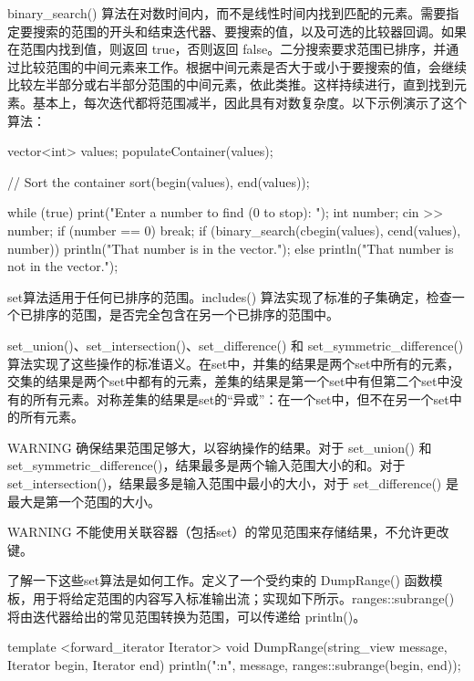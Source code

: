 binary\_search() 算法在对数时间内，而不是线性时间内找到匹配的元素。需要指定要搜索的范围的开头和结束迭代器、要搜索的值，以及可选的比较器回调。如果在范围内找到值，则返回 true，否则返回 false。二分搜索要求范围已排序，并通过比较范围的中间元素来工作。根据中间元素是否大于或小于要搜索的值，会继续比较左半部分或右半部分范围的中间元素，依此类推。这样持续进行，直到找到元素。基本上，每次迭代都将范围减半，因此具有对数复杂度。以下示例演示了这个算法：

\begin{cpp}
vector<int> values;
populateContainer(values);

// Sort the container
sort(begin(values), end(values));

while (true) {
    print("Enter a number to find (0 to stop): ");
    int number;
    cin >> number;
    if (number == 0) { break; }
    if (binary_search(cbegin(values), cend(values), number)) {
        println("That number is in the vector.");
    } else {
        println("That number is not in the vector.");
    }
}
\end{cpp}


set算法适用于任何已排序的范围。includes() 算法实现了标准的子集确定，检查一个已排序的范围，是否完全包含在另一个已排序的范围中。

set\_union()、set\_intersection()、set\_difference() 和 set\_symmetric\_difference() 算法实现了这些操作的标准语义。在set中，并集的结果是两个set中所有的元素，交集的结果是两个set中都有的元素，差集的结果是第一个set中有但第二个set中没有的所有元素。对称差集的结果是set的“异或”：在一个set中，但不在另一个set中的所有元素。

\begin{myWarning}{WARNING}
确保结果范围足够大，以容纳操作的结果。对于 set\_union() 和 set\_symmetric\_difference()，结果最多是两个输入范围大小的和。对于 set\_intersection()，结果最多是输入范围中最小的大小，对于 set\_difference() 是最大是第一个范围的大小。
\end{myWarning}

\begin{myWarning}{WARNING}
不能使用关联容器（包括set）的常见范围来存储结果，不允许更改键。
\end{myWarning}

了解一下这些set算法是如何工作。定义了一个受约束的 DumpRange() 函数模板，用于将给定范围的内容写入标准输出流；实现如下所示。ranges::subrange() 将由迭代器给出的常见范围转换为范围，可以传递给 println()。

\begin{cpp}
template <forward_iterator Iterator>
void DumpRange(string_view message, Iterator begin, Iterator end)
{
    println("{}{:n}", message, ranges::subrange(begin, end));
}
\end{cpp}

